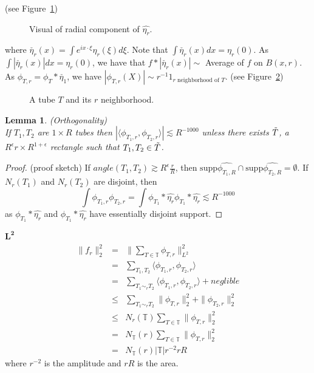 \documentclass[12pt]{amsart}
\newtheorem{lemma}[theorem]{Lemma}
\newcommand{\spp}{\textrm{supp}}
\newcommand{\T}{\mathbb{T}}
\begin{document}
(see Figure~\ref{fig:visualetar})
\begin{figure}[h]
    \centering
    
    \caption{Visual of radial component of $\hat{\eta_r}$.}
    \label{fig:visualetar}
\end{figure}
where $\check{\eta_r}(x)=\int e^{i x \cdot \xi }\eta_r(\xi)d \xi$. Note that $\int \check{\eta_r}(x) dx =\eta_r(0)$. 
As $\int |\check{\eta_r}(x)|dx=\eta_r(0)$, we have that $f*|\check{\eta_r}(x)|\sim $ Average of $f$ on $B(x,r)$. As $\phi_{T,r}=\phi_T*\check{\eta_1}$, we have 
$|\phi_{T,r}(X)|\sim r^{-1} 1_{r \text{ neighborhood of } T}$. (see Figure~\ref{fig:phitr})
\begin{figure}[h]
    \centering
    
    \caption{A tube $T$ and its $r$ neighborhood.}
    \label{fig:phitr}
\end{figure}
\begin{lemma}(Orthogonality)\\
If $T_1,T_2$ are $1 \times R$ tubes then $|\langle \phi_{T_1,r}, \phi_{T_2,r}\rangle|\lesssim R^{-1000}$ unless there exists $\Tilde{T}$, a $R^\epsilon r \times R^{1+\epsilon}$ rectangle such that $T_1, T_2 \in \Tilde{T}$.  
\end{lemma}
\begin{proof}(proof sketch)
If $angle(T_1,T_2)\gtrsim R^\epsilon \frac{r}{R}$, then $\spp \hat{\phi_{T_1,R}}\cap \spp \hat{\phi_{T_2,R}}=\emptyset$.  If $N_r(T_1)$ and $N_r(T_2)$ are disjoint, then 
$$\int \phi_{T_1,r}\phi_{T_2,r}=\int \phi_{T_1}*\hat{\eta_r}\phi_{T_1}*\hat{\eta_r} \lesssim R^{-1000}$$
as $\phi_{T_1}*\hat{\eta_r}$ and $\phi_{T_1}*\hat{\eta_r}$ have essentially disjoint support. 
\end{proof}
$\mathbf{L^2}$ 
\begin{eqnarray}
    \|f_r\|_2^2&=& \|\sum_{T \in \T}\phi_{T,r}\|_{L^2}^2\\
    &=& \sum_{T_1,T_2} \langle \phi_{T_1,r}, \phi_{T_2,r}\rangle\\
    &=& \sum_{T_1 \sim_r T_2} \langle \phi_{T_1,r}, \phi_{T_2,r}\rangle + neglible \\
    &\leq& \sum_{T_1\sim_r T_2} \|\phi_{T,r}\|_2^2+\|\phi_{T_2,r}\|^2_{2}\\
    & \leq & N_r(\T) \sum_{T \in \T} \|\phi_{T,r}\|_2^2\\
    &=& N_{\T}(r) \sum_{T \in \T}\|\phi_{T,r}\|_2^2\\
    &=& N_{\T}(r)|\T|r^{-2}rR
\end{eqnarray}
where $r^{-2}$ is the amplitude and $rR$ is the area. 
\end{document}
